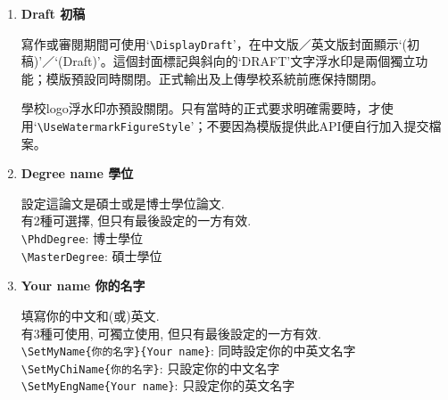 \begin{enumerate}
{    有3種可使用, 可獨立使用, 但只有最後設定的一方有效\\
    \verb|\SetTitle{你的題目}{Your Title}|: 同時設定中英文題目\\
    \verb|\SetChiTitle{你的題目}|: 只設定中文題目\\
    \verb|\SetEngTitle{Your Title}|: 只設定英文題目\\

    如:\\
    \verb|\SetTitle %|\\
    \verb|{中文題目中文題目} %|\\
    \verb|{Your Title Your Title}|\\
    \verb|'%'|是必須的, 是用來跟LaTeX說這3行是同一句話.

    或\\
    \verb|\SetChiTitle{中文題目中文題目}|\\
    \verb|\SetEngTitle{Your Title \\ Your Title}|

    圖書館說不管你是編寫中英混合或全英文版, 都\textbf{必須}同時存在中英題目.
  } %

  \item
  {
    \textbf{Draft 初稿}

    寫作或審閱期間可使用`\verb|\DisplayDraft|'，在中文版／英文版封面顯示`(初稿)'／`(Draft)'。這個封面標記與斜向的`DRAFT'文字浮水印是兩個獨立功能；模版預設同時關閉。正式輸出及上傳學校系統前應保持關閉。

    學校logo浮水印亦預設關閉。只有當時的正式要求明確需要時，才使用`\verb|\UseWatermarkFigureStyle|'；不要因為模版提供此API便自行加入提交檔案。
  } %

  \item
  {
    \textbf{Degree name 學位}

    設定這論文是碩士或是博士學位論文.\\
    有2種可選擇, 但只有最後設定的一方有效.\\
    \verb|\PhdDegree|: 博士學位\\
    \verb|\MasterDegree|: 碩士學位
  } %

  \item
  {
    \textbf{Your name 你的名字}

    填寫你的中文和(或)英文.\\
    有3種可使用, 可獨立使用, 但只有最後設定的一方有效.\\
    \verb|\SetMyName{你的名字}{Your name}|: 同時設定你的中英文名字\\
    \verb|\SetMyChiName{你的名字}|: 只設定你的中文名字\\
    \verb|\SetMyEngName{Your name}|: 只設定你的英文名字
  } %


\end{enumerate}
